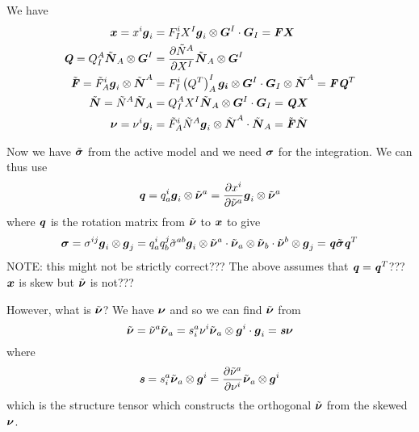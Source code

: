 We have
\begin{align}
  \boldsymbol{x}=x^{i}\boldsymbol{g}_{i}&=F^{i}_{I}X^{I} \boldsymbol{g}_{i} \otimes \boldsymbol{G}^{I} \cdot\boldsymbol{G}_{I}=\boldsymbol{\mathit{F}}\boldsymbol{X}\\
  \boldsymbol{\mathit{Q}}=Q^{A}_{I} \tilde{\boldsymbol{N}}_{A} \otimes \boldsymbol{G}^{I} &= \dfrac{\partial \tilde{N}^{A}}{\partial X^{I}}  \tilde{\boldsymbol{N}}_{A} \otimes \boldsymbol{G}^{I} \\
  \tilde{\boldsymbol{\mathit{F}}}=\tilde{F}^{i}_{A} \boldsymbol{g}_{i} \otimes \tilde{\boldsymbol{N}}^{A} &=F^{i}_{I}\left( {Q}^{T} \right)^{I}_{A} \boldsymbol{g_{i}} \otimes \boldsymbol{G}^{I} \cdot \boldsymbol{G}_{I} \otimes \tilde{\boldsymbol{N}}^{A} =\boldsymbol{\mathit{F}}{\boldsymbol{\mathit{Q}}}^{T}\\
  \tilde{\boldsymbol{N}}=\tilde{N}^{A}\tilde{\boldsymbol{N}}_{A}&=Q^{A}_{I}X^{I} \tilde{\boldsymbol{N}}_{A} \otimes \boldsymbol{G}^{I} \cdot\boldsymbol{G}_{I}=\boldsymbol{\mathit{Q}}\boldsymbol{X} \\
  \boldsymbol{\nu}=\nu^{i}\boldsymbol{g}_{i}&=\tilde{F}^{i}_{A}\tilde{N}^{A} \boldsymbol{g}_{i} \otimes \tilde{\boldsymbol{N}}^{A} \cdot\tilde{\boldsymbol{N}}_{A}=\tilde{\boldsymbol{\mathit{F}}}\tilde{\boldsymbol{N}}
\end{align}

Now we have $\tilde{\boldsymbol{\mathit{\sigma}}}$ from the active model and we need
$\boldsymbol{\mathit{\sigma}}$ for the integration. We can thus use
\begin{equation}
  \boldsymbol{\mathit{q}}=q^{i}_{a} \boldsymbol{g}_{i} \otimes \tilde{\boldsymbol{\nu}}^{a} = \dfrac{\partial x^{i}}{\partial \tilde{\nu}^{a}}  \boldsymbol{g}_{i} \otimes \tilde{\boldsymbol{\nu}}^{a} 
\end{equation}
where $\boldsymbol{\mathit{q}}$ is the rotation matrix from $\tilde{\boldsymbol{\nu}}$ to
$\boldsymbol{x}$ to give
\begin{equation}
  \boldsymbol{\mathit{\sigma}}=\sigma^{ij} \boldsymbol{g}_{i} \otimes \boldsymbol{g}_{j} =q^{i}_{a}q^{j}_{b}\tilde{\sigma}^{ab} \boldsymbol{g}_{i} \otimes \tilde{\boldsymbol{\nu}}^{a} \cdot \tilde{\boldsymbol{\nu}}_{a} \otimes \tilde{\boldsymbol{\nu}}_{b} \cdot \tilde{\boldsymbol{\nu}}^{b} \otimes \boldsymbol{g}_{j} =\boldsymbol{\mathit{q}}\tilde{\boldsymbol{\mathit{\sigma}}}{\boldsymbol{\mathit{q}}}^{T}
\end{equation}
NOTE: this might not be strictly correct??? The above assumes that
$\boldsymbol{\mathit{q}}={\boldsymbol{\mathit{q}}}^{T}$??? $\boldsymbol{x}$ is skew but
$\tilde{\boldsymbol{\nu}}$ is not???

However, what is $\tilde{\boldsymbol{\nu}}$? We have $\boldsymbol{\nu}$ and so we can
find $\tilde{\boldsymbol{\nu}}$ from
\begin{equation}
  \tilde{\boldsymbol{\nu}}=\tilde{\nu}^{a}\tilde{\boldsymbol{\nu}}_{a}=s^{a}_{i}\nu^{i} \tilde{\boldsymbol{\nu}}_{a} \otimes \boldsymbol{g}^{i} \cdot\boldsymbol{g}_{i}=\boldsymbol{\mathit{s}}\boldsymbol{\nu}
\end{equation}
where
\begin{equation}
  \boldsymbol{\mathit{s}}=s^{a}_{i} \tilde{\boldsymbol{\nu}}_{a} \otimes \boldsymbol{g}^{i} = \dfrac{\partial \tilde{\nu}^{a}}{\partial \nu^{i}}  \tilde{\boldsymbol{\nu}}_{a} \otimes \boldsymbol{g}^{i} 
\end{equation}
which is the structure tensor which constructs the orthogonal
$\tilde{\boldsymbol{\nu}}$ from the skewed $\boldsymbol{\nu}$.

